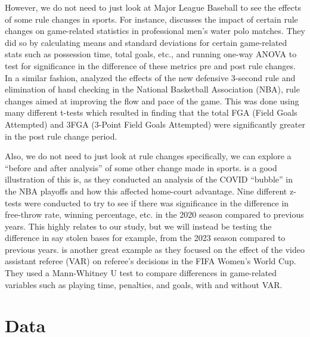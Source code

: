 \documentclass[12pt]{article}
\begin{document}
However, we do not need to just look at Major League Baseball to see
the effects of some rule changes in sports. For instance, \citet{Madera}
discusses the impact of certain rule changes on game-related statistics in
professional men's water polo matches. They did so by calculating means and
standard deviations for certain game-related stats such as possession time,
total goals, etc., and running one-way ANOVA to test for significance in the
difference of these metrics pre and post rule changes. In a similar fashion,
\citet{Nourayi} analyzed the effects of the new defensive 3-second rule and
elimination of hand checking in the National Basketball Association (NBA), rule
changes aimed at improving the flow and pace of the game. This was done using
many different t-tests which resulted in finding that the total FGA (Field Goals
Attempted) and 3FGA (3-Point Field Goals Attempted) were significantly greater
in the post rule change period.

Also, we do not need to just look at rule changes specifically, we can explore
a ``before and after analysis'' of some other change made in sports. \citet{Price}
is a good illustration of this is, as they conducted an analysis of the COVID
``bubble'' in the NBA playoffs and how this affected home-court advantage.
Nine different z-tests were conducted to try to see if there was significance in
the difference in free-throw rate, winning percentage, etc. in the 2020 season
compared to previous years. This highly relates to our study, but we will instead
be testing the difference in say stolen bases for example, from the 2023 season
compared to previous years. \citet{Zhang} is another great example as they
focused on the effect of the video assistant referee (VAR) on referee's decisions
in the FIFA Women's World Cup. They used a Mann-Whitney U test to compare differences
in game-related variables such as playing time, penalties, and goals, with and
without VAR.


\section{Data}
\label{sec:data}
\end{document}
